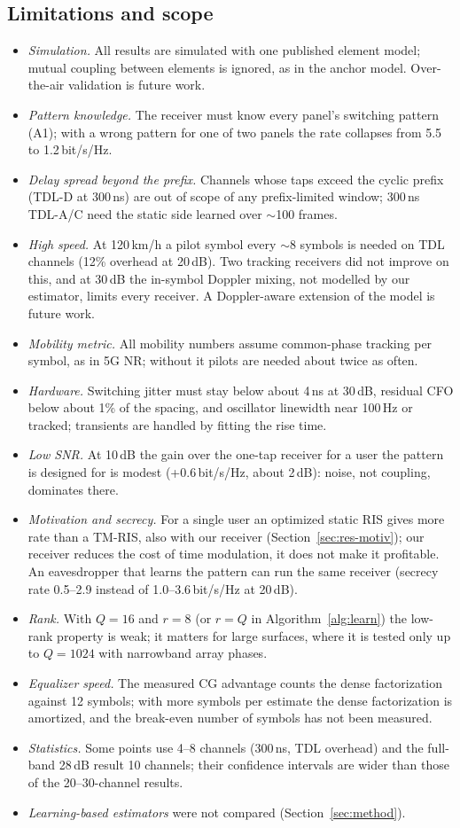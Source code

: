 \subsection{Limitations and scope}
\begin{itemize}
\item \emph{Simulation.} All results are simulated with one published element model; mutual
coupling between elements is ignored, as in the anchor model. Over-the-air validation is future work.
\item \emph{Pattern knowledge.} The receiver must know every panel's switching pattern (A1); with a
wrong pattern for one of two panels the rate collapses from 5.5 to 1.2\,bit/s/Hz.
\item \emph{Delay spread beyond the prefix.} Channels whose taps exceed the cyclic prefix
(TDL-D at 300\,ns) are out of scope of any prefix-limited window; 300\,ns TDL-A/C need the static
side learned over $\sim$100 frames.
\item \emph{High speed.} At 120\,km/h a pilot symbol every $\sim$8 symbols is needed on TDL
channels (12\% overhead at 20\,dB). Two tracking receivers did not improve on this, and at 30\,dB the
in-symbol Doppler mixing, not modelled by our estimator, limits every receiver. A Doppler-aware
extension of the model is future work.
\item \emph{Mobility metric.} All mobility numbers assume common-phase tracking per symbol, as in
5G NR; without it pilots are needed about twice as often.
\item \emph{Hardware.} Switching jitter must stay below about 4\,ns at 30\,dB, residual CFO below
about 1\% of the spacing, and oscillator linewidth near 100\,Hz or tracked; transients are handled by
fitting the rise time.
\item \emph{Low SNR.} At 10\,dB the gain over the one-tap receiver for a user the pattern is designed
for is modest (+0.6\,bit/s/Hz, about 2\,dB): noise, not coupling, dominates there.
\item \emph{Motivation and secrecy.} For a single user an optimized static RIS gives more rate than a TM-RIS, also with
our receiver (Section~\ref{sec:res-motiv}); our receiver reduces the cost of time modulation, it does not make it profitable.
An eavesdropper that learns the pattern can run the same receiver (secrecy rate 0.5--2.9 instead of 1.0--3.6\,bit/s/Hz at 20\,dB).
\item \emph{Rank.} With $Q=16$ and $r=8$ (or $r=Q$ in Algorithm~\ref{alg:learn}) the low-rank property
is weak; it matters for large surfaces, where it is tested only up to $Q=1024$ with narrowband array phases.
\item \emph{Equalizer speed.} The measured CG advantage counts the dense factorization against 12
symbols; with more symbols per estimate the dense factorization is amortized, and the break-even
number of symbols has not been measured.
\item \emph{Statistics.} Some points use 4--8 channels (300\,ns, TDL overhead) and the full-band
28\,dB result 10 channels; their confidence intervals are wider than those of the 20--30-channel results.
\item \emph{Learning-based estimators} were not compared (Section~\ref{sec:method}).
\end{itemize}
